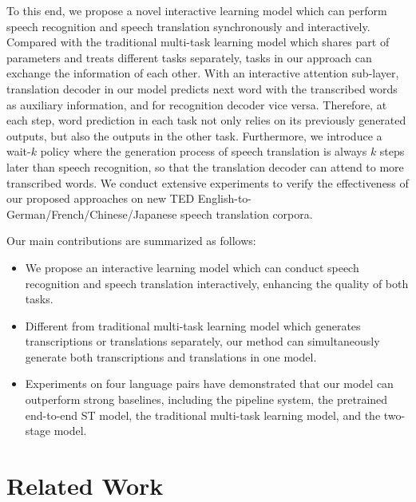 \documentclass[letterpaper]{article} %
\begin{document}
To this end, we propose a novel interactive learning model which can perform speech recognition and speech translation synchronously and interactively. Compared with the traditional multi-task learning model which shares part of parameters and treats different tasks separately, tasks in our approach can exchange the information of each other. With an interactive attention sub-layer, translation decoder in our model predicts next word with the transcribed words as auxiliary information, and for recognition decoder vice versa. Therefore, at each step, word prediction in  each task not only relies on its previously generated outputs, but also the outputs in the other task.
Furthermore, we introduce a wait-$k$ policy where the generation process of speech translation is always $k$ steps later than speech recognition, so that the translation decoder can attend to more transcribed words.
We conduct extensive experiments to verify the effectiveness of our proposed approaches on new TED English-to-German/French/Chinese/Japanese speech translation corpora.

Our main contributions are summarized as follows:
\begin{itemize}
	\item We propose an interactive learning model which can conduct speech recognition and speech translation interactively, enhancing the quality of both tasks.
	\item Different from traditional multi-task learning model which generates transcriptions or translations separately, our method can simultaneously generate both transcriptions and translations in one model.
	\item Experiments on four language pairs have demonstrated that our model can outperform strong baselines, including the pipeline system, the pretrained end-to-end ST model, the traditional multi-task learning model, and the two-stage model.
\end{itemize}

\section{Related Work}
\end{document}
